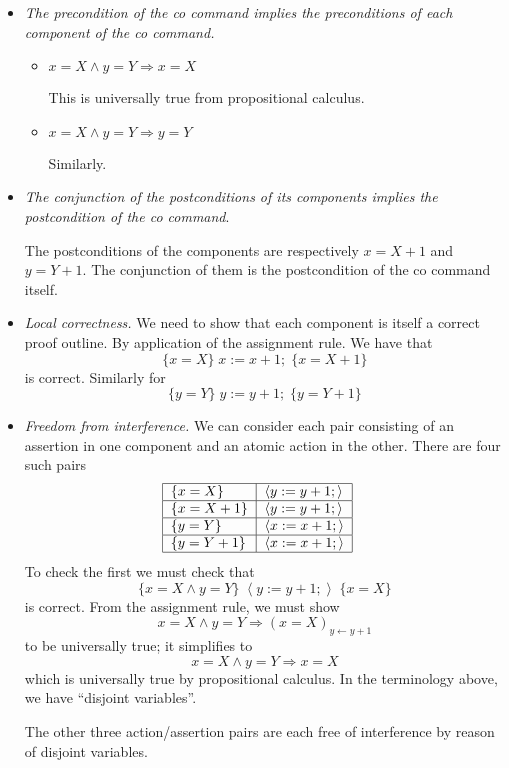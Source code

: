 \documentclass[muchmore,11pt]{article}%
\begin{document}
\begin{itemize}
\item \emph{The precondition of the co command implies the preconditions of
each component of the co command.}

\begin{itemize}
\item $x=X\wedge y=Y\Rightarrow x=X$

This is universally true from propositional calculus.

\item $x=X\wedge y=Y\Rightarrow y=Y$

Similarly.
\end{itemize}

\item \emph{The conjunction of the postconditions of its components implies
the postcondition of the co command}$.$

The postconditions of the components are respectively $x=X+1$ and $y=Y+1$. The
conjunction of them is the postcondition of the co command itself.

\item \emph{Local correctness. }We need to show that each component is itself
a correct proof outline. By application of the assignment rule. We have that%
\[
\{x=X\}\;x:=x+1;\;\{x=X+1\}
\]
is correct. Similarly for%
\[
\{y=Y\}\;y:=y+1;\;\{y=Y+1\}
\]


\item \emph{Freedom from interference.} We can consider each pair consisting
of an assertion in one component and an atomic action in the other. There are
four such pairs%
\[%
\begin{tabular}
[c]{|l|l|}\hline
$\{x=X\}$ & $\left\langle y:=y+1;\right\rangle $\\\hline
$\{x=X+1\}$ & $\left\langle y:=y+1;\right\rangle $\\\hline
$\{y=Y\}$ & $\left\langle x:=x+1;\right\rangle $\\\hline
$\{y=Y+1\}$ & $\left\langle x:=x+1;\right\rangle $\\\hline
\end{tabular}
\ \ \
\]
To check the first we must check that%
\[
\{x=X\wedge y=Y\}\;\left\langle y:=y+1;\right\rangle \;\{x=X\}
\]
is correct. From the assignment rule, we must show%
\[
x=X\wedge y=Y\Rightarrow\left(  x=X\right)  _{y\leftarrow y+1}%
\]
to be universally true; it simplifies to
\[
x=X\wedge y=Y\Rightarrow x=X
\]
which is universally true by propositional calculus. In the terminology above,
we have \textquotedblleft disjoint variables\textquotedblright.

The other three action/assertion pairs are each free of interference by reason
of disjoint variables.
\end{itemize}
\end{document}
